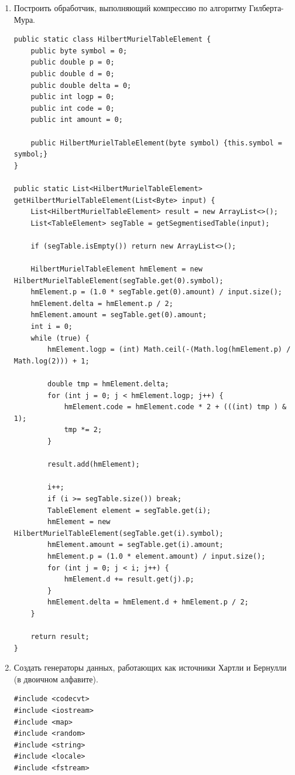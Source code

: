 \documentclass[a4paper,14pt]{extarticle}
\begin{document}
\begin{enumerate}
    \item Построить обработчик, выполняющий компрессию по алгоритму
    Гилберта-Мура.\\
    \begin{verbatim}
public static class HilbertMurielTableElement {
    public byte symbol = 0;
    public double p = 0;
    public double d = 0;
    public double delta = 0;
    public int logp = 0;
    public int code = 0;
    public int amount = 0;

    public HilbertMurielTableElement(byte symbol) {this.symbol = symbol;}
}

public static List<HilbertMurielTableElement> getHilbertMurielTableElement(List<Byte> input) {
    List<HilbertMurielTableElement> result = new ArrayList<>();
    List<TableElement> segTable = getSegmentisedTable(input);

    if (segTable.isEmpty()) return new ArrayList<>();

    HilbertMurielTableElement hmElement = new HilbertMurielTableElement(segTable.get(0).symbol);
    hmElement.p = (1.0 * segTable.get(0).amount) / input.size();
    hmElement.delta = hmElement.p / 2;
    hmElement.amount = segTable.get(0).amount;
    int i = 0;
    while (true) {
        hmElement.logp = (int) Math.ceil(-(Math.log(hmElement.p) / Math.log(2))) + 1;

        double tmp = hmElement.delta;
        for (int j = 0; j < hmElement.logp; j++) {
            hmElement.code = hmElement.code * 2 + (((int) tmp ) & 1);
            tmp *= 2;
        }

        result.add(hmElement);

        i++;
        if (i >= segTable.size()) break;
        TableElement element = segTable.get(i);
        hmElement = new HilbertMurielTableElement(segTable.get(i).symbol);
        hmElement.amount = segTable.get(i).amount;
        hmElement.p = (1.0 * element.amount) / input.size();
        for (int j = 0; j < i; j++) {
            hmElement.d += result.get(j).p;
        }
        hmElement.delta = hmElement.d + hmElement.p / 2;
    }

    return result;
}
    \end{verbatim}
    \item Создать генераторы данных, работающих как источники Хартли и
    Бернулли (в двоичном алфавите).
\begin{verbatim}
#include <codecvt>
#include <iostream>
#include <map>
#include <random>
#include <string>
#include <locale>
#include <fstream>


\end{verbatim}
\end{enumerate}
\end{document}
